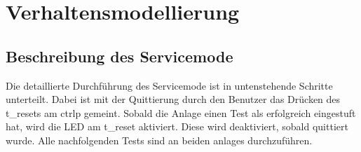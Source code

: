 

\FloatBarrier
\section{Verhaltensmodellierung}\label{sec:verhaltensmodellierung}

\subsection{Beschreibung des Servicemode}\label{subsec:beschreibung-des-servicemode}
Die detaillierte Durchführung des Servicemode ist in untenstehende Schritte unterteilt.
Dabei ist mit der Quittierung durch den Benutzer das Drücken des \gls{t_reset}s am \gls{ctrlp} gemeint.
Sobald die Anlage einen Test als erfolgreich eingestuft hat, wird die LED am \gls{t_reset} aktiviert.
Diese wird deaktiviert, sobald quittiert wurde.
Alle nachfolgenden Tests sind an beiden \glspl{anlage} durchzuführen.
